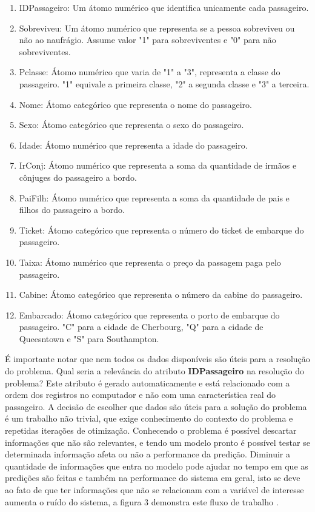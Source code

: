 \begin{enumerate}
\item IDPassageiro: Um átomo numérico que identifica unicamente cada passageiro.
\item Sobreviveu: Um átomo numérico que representa se a pessoa sobreviveu ou não ao naufrágio. Assume valor "1" para sobreviventes e "0" para não sobreviventes.
\item Pclasse: Átomo numérico que varia de "1" a "3", representa a classe do passageiro. "1" equivale a primeira classe, "2" a segunda classe e "3" a terceira.
\item Nome: Átomo categórico que representa o nome do passageiro.
\item Sexo: Átomo categórico que representa o sexo do passageiro.
\item Idade: Átomo numérico que representa a idade do passageiro.
\item IrConj: Átomo numérico que representa a soma da quantidade de irmãos e cônjuges do passageiro a bordo.
\item PaiFilh: Átomo numérico que representa a soma da quantidade de pais e filhos do passageiro a bordo.
\item Ticket: Átomo categórico que representa o número do ticket de embarque do passageiro.
\item Taixa: Átomo numérico que representa o preço da passagem paga pelo passageiro.
\item Cabine: Átomo categórico que representa o número da cabine do passageiro.
\item Embarcado: Átomo categórico que representa o porto de embarque do passageiro. "C"  para a cidade de Cherbourg, "Q"  para a cidade de Queesntown e "S"  para Southampton.
\end{enumerate}


É importante notar que nem todos os dados disponíveis são úteis para a resolução do problema. Qual seria a relevância do atributo \textbf{IDPassageiro} na resolução do problema? Este atributo é gerado automaticamente e está relacionado com a ordem dos registros no computador e não com uma característica real do passageiro. A decisão de escolher que dados são úteis para a solução do problema é um trabalho não trivial, que exige conhecimento do contexto do problema e repetidas iterações de otimização. Conhecendo o problema é possível descartar informações que não são relevantes, e tendo um modelo pronto é possível testar se determinada informação afeta ou não a performance da predição. Diminuir a quantidade de informações que entra no modelo pode ajudar no tempo em que as predições são feitas e também na performance do sistema em geral, isto se deve ao fato de que ter informações que não se relacionam com a variável de interesse aumenta o ruído do sistema, a figura 3 demonstra este fluxo de trabalho \cite{real2013}.

